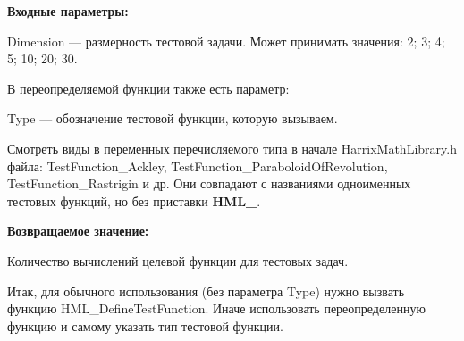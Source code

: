 \textbf{Входные параметры:}

Dimension --- размерность тестовой задачи. Может принимать значения: 2; 3; 4; 5; 10; 20; 30.

В переопределяемой функции также есть параметр:
  
Type --- обозначение тестовой функции, которую вызываем. 

Смотреть виды в переменных перечисляемого типа в начале HarrixMathLibrary.h файла: TestFunction\_Ackley, TestFunction\_ParaboloidOfRevolution, TestFunction\_Rastrigin и др. Они совпадают с названиями одноименных тестовых функций, но без приставки \textbf{HML\_}.

\textbf{Возвращаемое значение:}
 
Количество вычислений целевой функции для тестовых задач.

Итак, для обычного использования (без параметра Type) нужно вызвать функцию HML\_DefineTestFunction. Иначе использовать переопределенную функцию и самому указать тип тестовой функции.